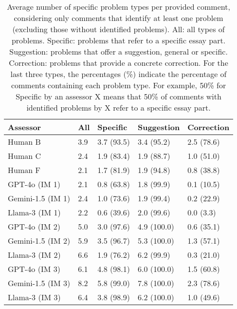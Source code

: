 \begin{table}[]
    \centering

\begin{tabular}{lllll}
\toprule
         Assessor & All &   Specific &  Suggestion & Correction \\
\midrule
               Human B & 3.9 & 3.7 (93.5) &  3.4 (95.2) & 2.5 (78.6) \\
               Human C & 2.4 & 1.9 (83.4) &  1.9 (88.7) & 1.0 (51.0) \\
               Human F & 2.1 & 1.7 (81.9) &  1.9 (94.8) & 0.8 (38.8) \\ \midrule
                
    GPT-4o (IM 1) & 2.1 & 0.8 (63.8) &  1.8 (99.9) & 0.1 (10.5) \\
Gemini-1.5 (IM 1) & 2.4 & 1.0 (73.6) &  1.9 (99.4) & 0.2 (22.9) \\
   Llama-3 (IM 1) & 2.2 & 0.6 (39.6) &  2.0 (99.6) &  0.0 (3.3) \\ \midrule
   
    GPT-4o (IM 2) & 5.0 & 3.0 (97.6) & 4.9 (100.0) & 0.6 (35.1) \\
Gemini-1.5 (IM 2) & 5.9 & 3.5 (96.7) & 5.3 (100.0) & 1.3 (57.1) \\
   Llama-3 (IM 2) & 6.6 & 1.9 (76.2) &  6.2 (99.9) & 0.3 (21.0) \\ \midrule
   
    GPT-4o (IM 3) & 6.1 & 4.8 (98.1) & 6.0 (100.0) & 1.5 (60.8) \\
Gemini-1.5 (IM 3) & 8.2 & 5.8 (99.0) & 7.8 (100.0) & 2.3 (78.6) \\
   Llama-3 (IM 3) & 6.4 & 3.8 (98.9) & 6.2 (100.0) & 1.0 (49.6) \\
\bottomrule
\end{tabular}
    
    \caption{Average number of specific problem types per provided comment, considering only comments that identify at least one problem (excluding those without identified problems). All: all types of problems. Specific: problems that refer to a specific essay part. Suggestion: problems that offer a suggestion, general or specific. Correction: problems that provide a concrete correction. For the last three types, the percentages (\%) indicate the percentage of comments containing each problem type. For example, 50\% for Specific by an assessor X means that 50\% of comments with identified problems by X refer to a specific essay part.}
    \label{tab:overallProblemChars}
\end{table}

